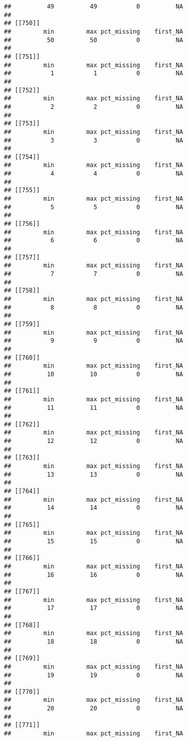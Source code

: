 \documentclass[
]{article}
\begin{document}
\begin{verbatim}
##          49          49           0          NA 
## 
## [[750]]
##         min         max pct_missing    first_NA 
##          50          50           0          NA 
## 
## [[751]]
##         min         max pct_missing    first_NA 
##           1           1           0          NA 
## 
## [[752]]
##         min         max pct_missing    first_NA 
##           2           2           0          NA 
## 
## [[753]]
##         min         max pct_missing    first_NA 
##           3           3           0          NA 
## 
## [[754]]
##         min         max pct_missing    first_NA 
##           4           4           0          NA 
## 
## [[755]]
##         min         max pct_missing    first_NA 
##           5           5           0          NA 
## 
## [[756]]
##         min         max pct_missing    first_NA 
##           6           6           0          NA 
## 
## [[757]]
##         min         max pct_missing    first_NA 
##           7           7           0          NA 
## 
## [[758]]
##         min         max pct_missing    first_NA 
##           8           8           0          NA 
## 
## [[759]]
##         min         max pct_missing    first_NA 
##           9           9           0          NA 
## 
## [[760]]
##         min         max pct_missing    first_NA 
##          10          10           0          NA 
## 
## [[761]]
##         min         max pct_missing    first_NA 
##          11          11           0          NA 
## 
## [[762]]
##         min         max pct_missing    first_NA 
##          12          12           0          NA 
## 
## [[763]]
##         min         max pct_missing    first_NA 
##          13          13           0          NA 
## 
## [[764]]
##         min         max pct_missing    first_NA 
##          14          14           0          NA 
## 
## [[765]]
##         min         max pct_missing    first_NA 
##          15          15           0          NA 
## 
## [[766]]
##         min         max pct_missing    first_NA 
##          16          16           0          NA 
## 
## [[767]]
##         min         max pct_missing    first_NA 
##          17          17           0          NA 
## 
## [[768]]
##         min         max pct_missing    first_NA 
##          18          18           0          NA 
## 
## [[769]]
##         min         max pct_missing    first_NA 
##          19          19           0          NA 
## 
## [[770]]
##         min         max pct_missing    first_NA 
##          20          20           0          NA 
## 
## [[771]]
##         min         max pct_missing    first_NA 

\end{verbatim}
\end{document}
